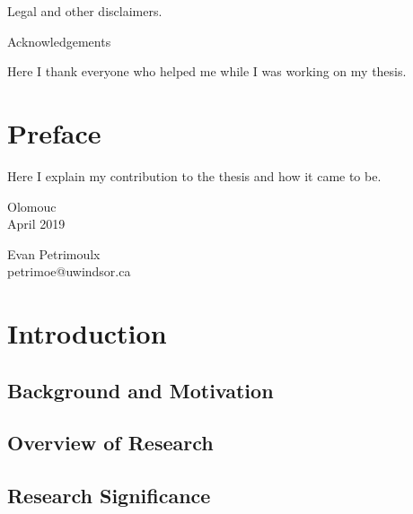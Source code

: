 \documentclass[a4paper,12pt,twoside]{report}
\begin{document}
\vfil
\noindent
Legal and other disclaimers.

\clearpage


\mbox{}
\vfil

\centerline{\Large Acknowledgements}

\bigskip

\noindent
Here I thank everyone who helped me while I was working on my thesis.

\vfil

\clearpage

\pagestyle{fancy}

\tableofcontents
{}

\chapter*{Preface}


Here I explain my contribution to the thesis and how it came to be.

\vspace{1cm}

\noindent
\parbox{.4\textwidth}{
Olomouc
\\
April 2019
}
\hfill
\parbox{.4\textwidth}{\flushright
Evan Petrimoulx
\\
petrimoe@uwindsor.ca
}

\clearpage
\pagestyle{empty}
\cleardoublepage

\pagestyle{fancy}


\chapter{Introduction}
\label{chapter.intro}
\section{Background and Motivation}
\section{Overview of Research}
\section{Research Significance}
\end{document}
